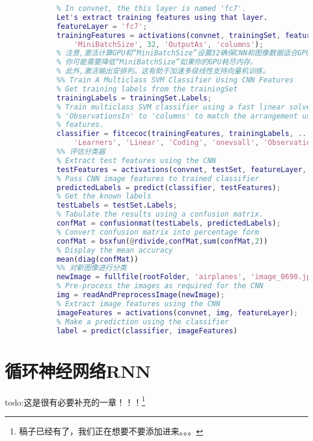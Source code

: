\begin{lstlisting}[language = Matlab]
            % but typically starting with the layer right before the classification layer is a good place to start.
            % In convnet, the this layer is named 'fc7'.
            Let's extract training features using that layer.
            featureLayer = 'fc7';
            trainingFeatures = activations(convnet, trainingSet, featureLayer, ...
                'MiniBatchSize', 32, 'OutputAs', 'columns');
            % 注意,激活计算GPU和“MiniBatchSize”设置32确保CNN和图像数据适合GPU内存。
            % 你可能需要降低“MiniBatchSize”如果你的GPU耗尽内存。
            % 此外,激活输出安排列。这有助于加速多级线性支持向量机训练。
            %% Train A Multiclass SVM Classifier Using CNN Features
            % Get training labels from the trainingSet
            trainingLabels = trainingSet.Labels;
            % Train multiclass SVM classifier using a fast linear solver, and set
            % 'ObservationsIn' to 'columns' to match the arrangement used for training
            % features.
            classifier = fitcecoc(trainingFeatures, trainingLabels, ...
                'Learners', 'Linear', 'Coding', 'onevsall', 'ObservationsIn', 'columns');
            %% 评估分类器
            % Extract test features using the CNN
            testFeatures = activations(convnet, testSet, featureLayer, 'MiniBatchSize',32);
            % Pass CNN image features to trained classifier
            predictedLabels = predict(classifier, testFeatures);
            % Get the known labels
            testLabels = testSet.Labels;
            % Tabulate the results using a confusion matrix.
            confMat = confusionmat(testLabels, predictedLabels);
            % Convert confusion matrix into percentage form
            confMat = bsxfun(@rdivide,confMat,sum(confMat,2))
            % Display the mean accuracy
            mean(diag(confMat))
            %% 对新图像进行分类
            newImage = fullfile(rootFolder, 'airplanes', 'image_0690.jpg');
            % Pre-process the images as required for the CNN
            img = readAndPreprocessImage(newImage);
            % Extract image features using the CNN
            imageFeatures = activations(convnet, img, featureLayer);
            % Make a prediction using the classifier
            label = predict(classifier, imageFeatures)
            \end{lstlisting}

\section{循环神经网络RNN}


    todo:这是很有必要补充的一章！！！\footnote{稿子已经有了，我们正在想要不要添加进来。。。}
